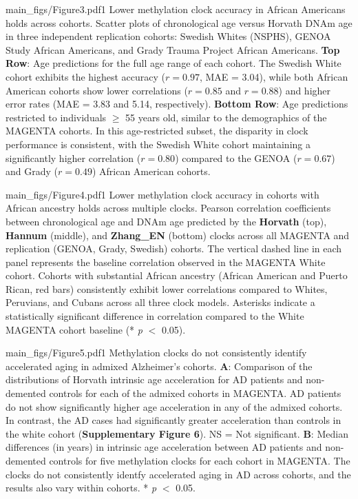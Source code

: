 {main_figs/Figure3.pdf}{1}
    {Lower methylation clock accuracy in African Americans holds across cohorts.}
    {{
        Scatter plots of chronological age versus Horvath DNAm age in three independent replication cohorts: Swedish Whites (NSPHS), GENOA Study African Americans, and Grady Trauma Project African Americans.
        \textbf{Top Row}: Age predictions for the full age range of each cohort. The Swedish White cohort exhibits the highest accuracy ($r = 0.97$, MAE = 3.04), while both African American cohorts show lower correlations ($r = 0.85$ and $r = 0.88$) and higher error rates (MAE = 3.83 and 5.14, respectively).
        \textbf{Bottom Row}: Age predictions restricted to individuals $\ge$ 55 years old, similar to the demographics of the MAGENTA cohorts. In this age-restricted subset, the disparity in clock performance is consistent, with the Swedish White cohort maintaining a significantly higher correlation ($r = 0.80$) compared to the GENOA ($r = 0.67$) and Grady ($r = 0.49$) African American cohorts.
    }}

{main_figs/Figure4.pdf}{1}
    {Lower methylation clock accuracy in cohorts with African ancestry holds across multiple clocks.}
    {{
        Pearson correlation coefficients between chronological age and DNAm age predicted by the \textbf{Horvath} (top), \textbf{Hannum} (middle), and \textbf{Zhang\_EN} (bottom) clocks across all MAGENTA and replication (GENOA, Grady, Swedish) cohorts.
        The vertical dashed line in each panel represents the baseline correlation observed in the MAGENTA White cohort.
        Cohorts with substantial African ancestry (African American and Puerto Rican, red bars) consistently exhibit lower correlations compared to Whites, Peruvians, and Cubans across all three clock models.
        Asterisks indicate a statistically significant difference in correlation compared to the White MAGENTA cohort baseline (* \textit{p} $<$ 0.05).
    }}

{main_figs/Figure5.pdf}{1}
    {Methylation clocks do not consistently identify accelerated aging in admixed Alzheimer's cohorts.}
    {{
        {\textbf{A}: Comparison of the distributions of Horvath intrinsic age acceleration for AD patients and non-demented controls for each of the admixed cohorts in MAGENTA. AD patients do not show significantly higher age acceleration in any of the admixed cohorts. In contrast, the AD cases had significantly greater acceleration than controls in the white cohort (\textbf{Supplementary Figure 6}). NS = Not significant.}
        {\textbf{B}: Median differences (in years) in intrinsic age acceleration between AD patients and non-demented controls for five methylation clocks for each cohort in MAGENTA. The clocks do not consistently identfy accelerated aging in AD across cohorts, and the results also vary within cohorts. * \textit{p} $<$ 0.05.}
    }}

